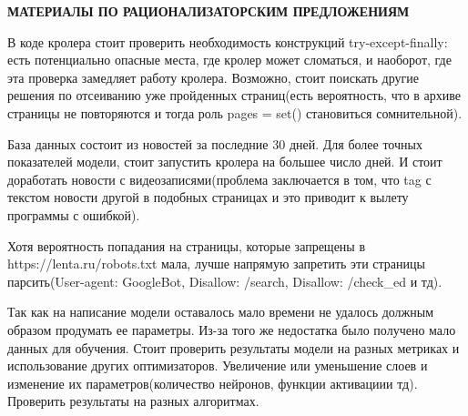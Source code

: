 \begin{center}
\bfseries{\large МАТЕРИАЛЫ ПО РАЦИОНАЛИЗАТОРСКИМ ПРЕДЛОЖЕНИЯМ}
\end{center}

В коде кролера стоит проверить необходимость конструкций try-except-finally: есть потенциально опасные места, где кролер может сломаться, и наоборот, где эта проверка замедляет работу кролера. Возможно, стоит поискать другие решения по отсеиванию уже пройденных страниц(есть вероятность, что в архиве страницы не повторяются и тогда роль pages = set() становиться сомнительной).

База данных состоит из новостей за последние 30 дней. Для более точных показателей модели, стоит запустить кролера на большее число дней. И стоит доработать новости с видеозаписями(проблема заключается в том, что tag с текстом новости другой в подобных страницах и это приводит к вылету программы с ошибкой).

Хотя вероятность попадания на страницы, которые запрещены в https://lenta.ru/robots.txt мала, лучше напрямую запретить эти страницы парсить(User-agent: GoogleBot, Disallow: /search, Disallow: /check\_ed и тд).

Так как на написание модели оставалось мало времени не удалось должным образом продумать ее параметры. Из-за того же недостатка было получено мало данных для обучения. Стоит проверить результаты модели на разных метриках и использование других оптимизаторов. Увеличение или уменьшение слоев и изменение их параметров(количество нейронов, функции активациии тд). Проверить результаты на разных алгоритмах.

\pagebreak
